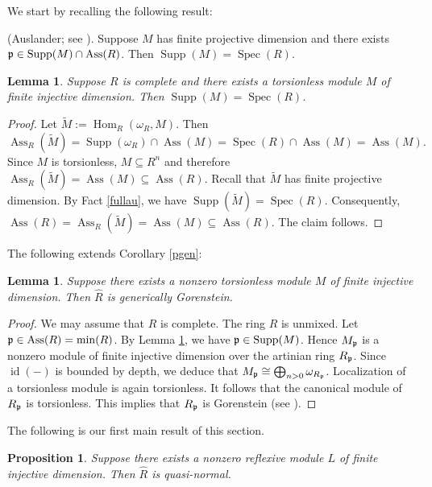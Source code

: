 \documentclass[10. pt,a4paper]{amsart}
\newtheorem{lemma}[theorem]{Lemma}
\newtheorem{proposition}[theorem]{Proposition}
\theoremstyle{definition}
\theoremstyle{remark}
\newcommand{\Ass}{\operatorname{Ass}}
\newcommand{\Spec}{\operatorname{Spec}}
\newcommand{\id}{\operatorname{id}}
\newcommand{\Supp}{\operatorname{Supp}}
\newcommand{\Hom}{\operatorname{Hom}}
\newcommand{\fp}{\frak{p}}
\begin{document}
We start by recalling the following result:

\begin{fact}\label{fullau}
	(Auslander; see \cite[I. Proposition 4.14]{PS}). Suppose $M$ has finite projective dimension and there exists $\fp \in \Supp(M) \cap \Ass(R)$. Then $\Supp(M) = \Spec(R)$.
\end{fact}

\begin{lemma}\label{sfs}
	Suppose $R$ is complete and there exists a torsionless module $M$ of finite injective dimension. Then $\Supp(M) = \Spec(R)$.
\end{lemma}

\begin{proof}
	Let $\tilde{M} := \Hom_R(\omega_R, M)$. Then
	\[
	\Ass_R(\tilde{M}) = \Supp(\omega_R) \cap \Ass(M) = \Spec(R) \cap \Ass(M) = \Ass(M).
	\]
	Since $M$ is torsionless, $M \subseteq R^n$ and therefore $\Ass_R(\tilde{M}) = \Ass(M) \subseteq \Ass(R)$. Recall that $\tilde{M}$ has finite projective dimension. By Fact \ref{fullau}, we have $\Supp(\tilde{M}) = \Spec(R)$. Consequently, $\Ass(R) = \Ass_R(\tilde{M}) = \Ass(M) \subseteq \Ass(R)$. The claim follows.
\end{proof}

The following extends Corollary \ref{pgen}:

\begin{lemma}\label{in}
	Suppose there exists a nonzero torsionless module $M$ of finite injective dimension. Then $\widehat{R}$ is generically Gorenstein.
\end{lemma}

\begin{proof}
	We may assume that $R$ is complete. The ring $R$ is unmixed. Let $\fp \in \Ass(R) = \min(R)$. By Lemma \ref{sfs}, we have $\fp \in \Supp(M)$. Hence $M_{\fp}$ is a nonzero module of finite injective dimension over the artinian ring $R_{\fp}$. Since $\id(-)$ is bounded by depth, we deduce that $M_{\fp} \cong \bigoplus_{n>0} \omega_{R_{\fp}}$. Localization of a torsionless module is again torsionless. It follows that the canonical module of $R_{\fp}$ is torsionless. This implies that $R_{\fp}$ is Gorenstein (see \cite[Corollary 3.7]{moh2}).
\end{proof}

The following is our first main result of this section.

\begin{proposition}\label{74}
	Suppose there exists a nonzero reflexive module $L$ of finite injective dimension. Then $\widehat{R}$ is quasi-normal.
\end{proposition}
\end{document}
